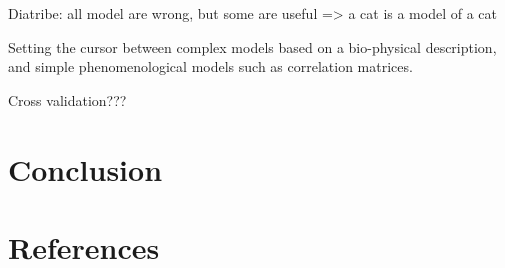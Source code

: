 \documentclass[5p]{elsarticle}
\begin{document}
Diatribe: all model are wrong, but some are useful => a cat is a model of a cat

Setting the cursor between complex models based on a bio-physical
description, and simple phenomenological models such as correlation
matrices.

\cite{mcintosh2010}

Cross validation???



\section{Conclusion}

{
\section*{References} \small 
 }

\end{document}
